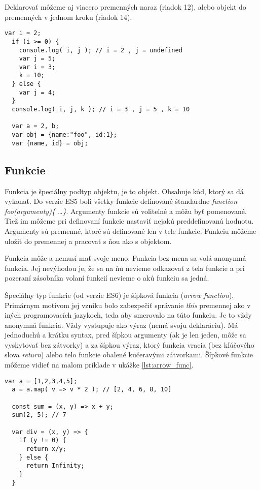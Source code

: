 Deklarovať môžeme aj viacero premenných naraz (riadok 12), alebo  objekt do premenných v jednom kroku (riadok 14).

\begin{lstlisting}[caption=JavaScript deklarovanie, label={lst:deklarovanie}]
  var i = 2;
  if (i >= 0) {
    console.log( i, j ); // i = 2 , j = undefined
    var j = 5;
    var i = 3;
    k = 10;
  } else {
    var j = 4;
  }
  console.log( i, j, k ); // i = 3 , j = 5 , k = 10

  var a = 2, b;
  var obj = {name:"foo", id:1};
  var {name, id} = obj;
\end{lstlisting}

\subsection{Funkcie}
\label{subsec:JSfunctions}
Funkcia je špeciálny podtyp objektu, je to  objekt. Obsahuje kód, ktorý sa dá vykonať. 
Do verzie ES5 boli všetky funkcie definované štandardne \emph{function foo(argumenty)\{ \ldots \}}. Argumenty funkcie sú voliteľné a môžu byť pomenované. Tiež im môžeme pri definovaní funkcie nastaviť nejakú preddefinovanú hodnotu. 
Argumenty sú premenné, ktoré sú definované len v tele funkcie. Funkciu môžeme uložiť do premennej a pracovať s ňou ako s objektom.

Funkcia môže a nemusí mať svoje meno. Funkcia bez mena sa volá anonymná funkcia. Jej nevýhodou je, že sa na ňu nevieme odkazovať z tela funkcie a pri pozeraní zásobníka volaní funkcií nevieme o akú funkciu sa jedná.

Špeciálny typ funkcie (od verzie ES6) je šípková funkcia (\emph{arrow function}). Primárnym motívom jej vzniku bolo zabezpečiť správanie \emph{this} premennej ako v iných programovacích jazykoch, teda aby smerovalo na túto funkciu. 
Je to vždy anonymná funkcia. Vždy vystupuje ako výraz (nemá svoju deklaráciu). Má jednoduchú a krátku syntax, pred šípkou argumenty (ak je len jeden, môže sa vyskytovať bez zátvorky) a za šípkou výraz, ktorý funkcia vracia (bez kľúčového slova \emph{return}) alebo telo funkcie obalené kučeravými zátvorkami. Šípkové funkcie môžeme vidieť na malom príklade v ukážke \ref{lst:arrow_func}.

\begin{lstlisting}[caption=šípkové funkcie, label={lst:arrow_func}]
  var a = [1,2,3,4,5];
  a = a.map( v => v * 2 ); // [2, 4, 6, 8, 10]

  const sum = (x, y) => x + y;
  sum(2, 5); // 7

  var div = (x, y) => {
    if (y != 0) {
      return x/y;
    } else {
      return Infinity;
    }
  }
\end{lstlisting}

